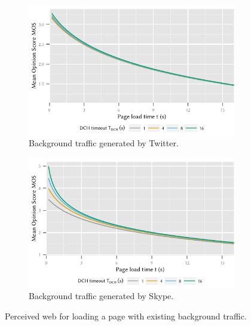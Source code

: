 \begin{figure}
	\begin{subfigure}[b]{\textwidth}
	\centering
	\includegraphics{network/network_traces/numerical_results/figures/qoe_with_backgroundapp_twitter}
	\caption{Background traffic generated by Twitter.}\label{fig:network:network_traces:numerical_results:web_qoe:twitter}
	\end{subfigure} 

	\begin{subfigure}[b]{\textwidth}
	\centering
	\includegraphics{network/network_traces/numerical_results/figures/qoe_with_backgroundapp_skype}
	\caption{Background traffic generated by Skype.}\label{fig:network:network_traces:numerical_results:web_qoe:skype}
	\end{subfigure}

	\caption{Perceived web  for loading a page with existing background traffic.}\label{fig:network:network_traces:numerical_results:web_qoe}
\end{figure}

